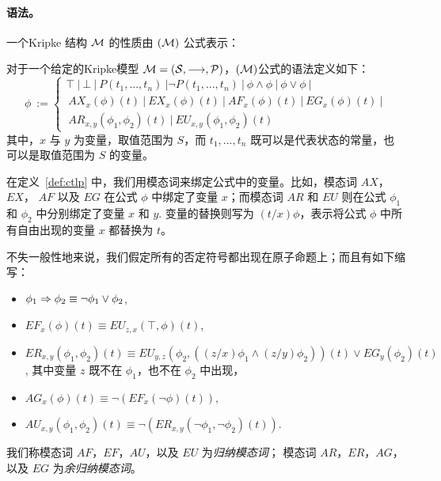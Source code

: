 \paragraph{语法。}一个Kripke 结构 $\cal M$ 的性质由 \CTLP{}$(\cal M)$ 公式表示：
\begin{definition}\label{def:ctlp}
    对于一个给定的Kripke模型 $\cal M = (S, \longrightarrow, \mathcal{P})$，\CTLP{}$(\cal M)$公式的语法定义如下：
        $$\phi \ :=
        \left\{\begin{array}{l}
        \top\ | \ \bot \ | \ P(t_1, ..., t_n)\  | \neg P(t_1, ..., t_n)\  | \ \phi  \wedge \phi \ |\ \phi \vee \phi \ | \\
        \ AX_x(\phi)(t)\ | \ EX_x(\phi)(t) \ | \ AF_x(\phi)(t) \ | \ EG_x(\phi)(t) \ |\\
        \ AR_{x,y}(\phi_1,\phi_2)(t)\ | \ EU_{x,y}(\phi_1,\phi_2)(t)
        \end{array}
        \right.$$
    其中，$x$ 与 $y$ 为变量，取值范围为 $S$，而 $t_1,...,t_n$ 既可以是代表状态的常量，也可以是取值范围为 $S$ 的变量。
\end{definition}
在定义~\ref{def:ctlp} 中，我们用模态词来绑定公式中的变量。比如，模态词 $AX$，$EX$， $AF$ 以及 $EG$ 在公式 $\phi$ 中绑定了变量 $x$；而模态词 $AR$ 和 $EU$ 则在公式 $\phi_1$ 和 $\phi_2$ 中分别绑定了变量 $x$ 和 $y$. 变量的替换则写为 $(t/x)\phi$，表示将公式 $\phi$ 中所有自由出现的变量 $x$ 都替换为 $t$。

不失一般性地来说，我们假定所有的否定符号都出现在原子命题上；而且有如下缩写：
\begin{itemize}
	\item $\phi_1\Rightarrow \phi_2 \equiv \neg \phi_1 \vee \phi_2$,
	\item $EF_x(\phi)(t) \equiv EU_{z,x}(\top, \phi)(t)$,
	\item $ER_{x, y}(\phi_1,\phi_2)(t) \equiv EU_{y,z}(\phi_2,((z/x)\phi_1 \wedge
	(z/y)\phi_2))(t)\vee EG_y(\phi_2)(t)$, 其中变量 $z$ 既不在 $\phi_1$，也不在 $\phi_2$ 中出现，
	\item $AG_x(\phi)(t) \equiv \neg (EF_x(\neg \phi)(t))$,
	\item $AU_{x,y}(\phi_1,\phi_2)(t) \equiv \neg (ER_{x,y}(\neg\phi_1,\neg\phi_2)(t))$.
\end{itemize}
我们称模态词 $AF$，$EF$，$AU$，以及 $EU$ 为\textit{归纳模态词}；
模态词 $AR$，$ER$，$AG$，以及 $EG$ 为\textit{余归纳模态词}。


